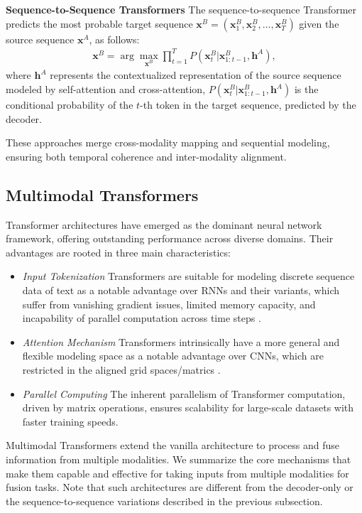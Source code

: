 \documentclass[journal]{IEEEtran}
\begin{document}
\textbf{Sequence-to-Sequence Transformers} The sequence-to-sequence Transformer predicts the most probable target sequence $\mathbf{x}^{B} = (\mathbf{x}_1^{B}, \mathbf{x}_2^{B}, \ldots, \mathbf{x}_T^{B})$ given the source sequence $\mathbf{x}^{A}$, as follows:
\begin{align}
\mathbf{x}^{B} = \arg \max_{\mathbf{x}^{B}} \prod_{t=1}^{T} P(\mathbf{x}_t^{B} | \mathbf{x}_{1:t-1}^{B}, \mathbf{h}^{A}),
\end{align}
where $\mathbf{h}^{A}$ represents the contextualized representation of the source sequence modeled by self-attention and cross-attention, $P(\mathbf{x}_t^{B} | \mathbf{x}_{1:t-1}^{B}, \mathbf{h}^{A})$ is the conditional probability of the $t$-th token in the target sequence, predicted by the decoder.

These approaches merge cross-modality mapping and sequential modeling, ensuring both temporal coherence and inter-modality alignment.

\subsection{Multimodal Transformers} \label{sect:transformers}

Transformer architectures have emerged as the dominant neural network framework, offering outstanding performance across diverse domains. Their advantages are rooted in three main characteristics:
\begin{itemize}
\item \textit{Input Tokenization} Transformers are suitable for modeling discrete sequence data of text as a notable advantage over RNNs and their variants, which suffer from vanishing gradient issues, limited memory capacity, and incapability of parallel computation across time steps \cite{Vaswani2017}.
\item \textit{Attention Mechanism} Transformers intrinsically have a more general and flexible modeling space as a notable advantage over CNNs, which are restricted in the aligned grid spaces/matrics \cite{Xu2023}.
\item \textit{Parallel Computing} The inherent parallelism of Transformer computation, driven by matrix operations, ensures scalability for large-scale datasets with faster training speeds.
\end{itemize}

Multimodal Transformers \cite{Xu2023} extend the vanilla architecture to process and fuse information from multiple modalities. We summarize the core mechanisms that make them capable and effective for taking inputs from multiple modalities for fusion tasks. Note that such architectures are different from the decoder-only or the sequence-to-sequence variations described in the previous subsection.
\end{document}

